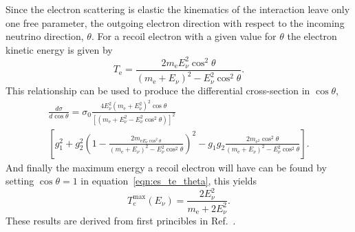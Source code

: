 Since the electron scattering is elastic the kinematics of the interaction
leave only one free parameter, the outgoing electron direction with respect
to the incoming neutrino direction, $\theta$.
For a recoil electron with a given value for $\theta$ the electron kinetic energy is
given by
\begin{equation}
    T_{\mathrm{e}}=\frac{2m_{\mathrm{e}}E_{\nu}^{2}\cos^{2}\theta}{(m_{\mathrm{e}}+E_{\nu})^2 - E_{\nu}^{2}\cos^2\theta}\text{.}
    \label{eqn:es_te_theta}
\end{equation}
This relationship can be used to produce the differential cross-section in $\cos\theta$,
\begin{multline}
\frac{d\sigma}{d\cos\theta}=\sigma_{0}\frac{4E_{\nu}^{2}(m_{\mathrm{e}}+E_{\nu}^{2})^2\cos\theta}{\left[(m_{\mathrm{e}}+E_{\nu}^{2} -E_{\nu}^{2}\cos^2\theta)\right]^2}\\
    \left[g_{1}^{2} + g_{2}^{2}\left(1 - \frac{2m_{\mathrm{e}E_{\nu}\cos^{2}\theta}}{(m_{\mathrm{e}}+E_{\nu})^2 -E_{\nu}^{2}\cos^2\theta} \right)^{2} - g_{1}g_{2}\frac{2m_{\mathrm{e}^{2}}\cos^{2}\theta}{(m_{\mathrm{e}}+E_{\nu})^{2}-E_{\nu}^{2}\cos^{2}\theta}\right]
    \text{.}
\end{multline}
And finally the maximum energy a recoil electron will have can be found by
setting $\cos\theta=1$ in equation~\eqref{eqn:es_te_theta}, this yields
\begin{equation}
    T_{e}^{\max}(E_\nu) = \frac{2E_{\nu}^{2}}{m_{\mathrm{e}}+ 2E_{\nu}^{2} }\text{.}
\end{equation}
These results are derived from first princibles in Ref.~\cite{giuntikim}.

